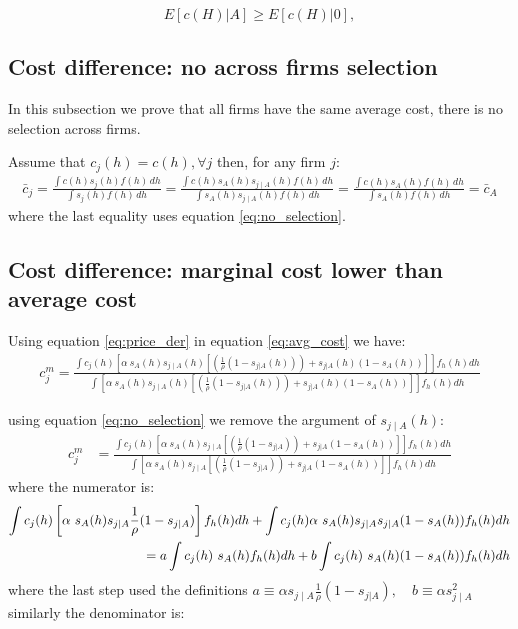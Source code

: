 \documentclass[12pt]{article}
\theoremstyle{plain}
\theoremstyle{plain}
\begin{document}
$$E[c(H)|A] \geq E[c(H)|0],$$

\bigskip

\subsection{Cost difference: no across firms selection}\label{sec:appendix2.1}
In this subsection we prove that all firms have the same average cost, there is no selection across firms. 

Assume that $c_j(h) = c(h), \forall j$ then, for any firm $j$: 
\begin{align}
\bar{c}_j = \frac{\int c(h)s_j(h)f(h)\,dh}{\int s_j(h)f(h)\,dh} = \frac{\int c(h)s_A(h) s_{j\mid A}(h)f(h)\,dh}{\int s_A(h) s_{j\mid A}(h)f(h)\,dh} 
=  \frac{\int c(h)s_A(h) f(h)\,dh}{\int s_A(h) f(h)\,dh} = \bar{c}_A    
\end{align}
where the last equality uses equation \ref{eq:no_selection}. 

\bigskip

\subsection{Cost difference: marginal cost lower than average cost}\label{sec:appendix3}



Using equation \ref{eq:price_der} in equation \ref{eq:avg_cost} we have: 
\begin{align}
    c^m_j = \frac{\int c_j(h) \left[\alpha \ s_A(h) s_{j\mid A}(h) \left[ \left(\frac{1}{\rho}(1-s_{j|A}(h))\right)  + s_{j|A}(h)  (1-s_A(h)) \right]  \right]  f_h(h) dh }{\int  \left[\alpha \ s_A(h) s_{j\mid A}(h) \left[ \left(\frac{1}{\rho}(1-s_{j|A}(h))\right)  + s_{j|A}(h)  (1-s_A(h)) \right]  \right]  f_h(h) dh }
\end{align}


using equation \ref{eq:no_selection} we remove the argument of $s_{j\mid A}(h)$: 
\begin{align}
    c^m_j 
    &= \frac{\int c_j(h) \left[\alpha \ s_A(h) s_{j\mid A} \left[ \left(\frac{1}{\rho}(1-s_{j|A})\right)  + s_{j|A}  (1-s_A(h)) \right]  \right]  f_h(h) dh }{\int  \left[\alpha \ s_A(h) s_{j\mid A} \left[ \left(\frac{1}{\rho}(1-s_{j|A})\right)  + s_{j|A}  (1-s_A(h)) \right]  \right]  f_h(h) dh } 
\end{align}
where the numerator is:
\begin{align}\label{eq:numerator}
  \int c_j(h) \left[\alpha \ s_A(h) s_{j\mid A} \frac{1}{\rho}(1-s_{j|A}) \right]  f_h(h) dh +\int c_j(h)\alpha \ s_A(h) s_{j\mid A}  s_{j|A}  (1-s_A(h))  f_h(h) dh \notag \\  
    = a \int c_j(h)  \ s_A(h) f_h(h) dh +b \int c_j(h) \ s_A(h)    (1-s_A(h))  f_h(h) dh  
\end{align}
where the last step used the definitions $a\equiv  \alpha s_{j\mid A} \frac{1}{\rho}(1-s_{j|A}), \quad b \equiv \alpha s_{j\mid A}^2 $
similarly the  denominator is: 
\end{document}
